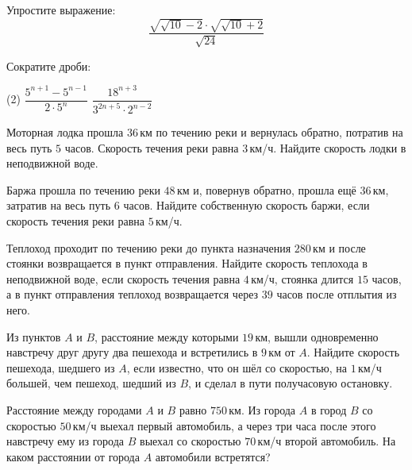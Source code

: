 %
%

\begin{class}[number=1]
	\begin{listofex}
		\item Упростите выражение:
		\[\dfrac{\sqrt{\sqrt{10}-2}\cdot\sqrt{\sqrt{10}+2}}{\sqrt{24}}\]
		\item Сократите дроби:
		\begin{tasks}(2)
			\task \( \dfrac{5^{n+1}-5^{n-1}}{2\cdot5^n} \)
			\task \( \dfrac{18^{n+3}}{3^{2n+5}\cdot2^{n-2}} \)
		\end{tasks}
		\item Моторная лодка прошла \( 36 \) км по течению реки и вернулась обратно, потратив на весь путь \( 5 \) часов. Скорость течения реки равна \( 3 \) км/ч. Найдите скорость лодки в неподвижной воде.
		\item Баржа прошла по течению реки \( 48 \) км и, повернув обратно, прошла ещё \( 36 \) км, затратив на весь путь \( 6 \) часов. Найдите собственную скорость баржи, если скорость течения реки равна \( 5 \) км/ч.
		\item Теплоход проходит по течению реки до пункта назначения \( 280 \) км и после стоянки возвращается в пункт отправления. Найдите скорость теплохода в неподвижной воде, если скорость течения равна \( 4 \) км/ч, стоянка длится \( 15 \) часов, а в пункт отправления теплоход возвращается через \( 39 \) часов после отплытия из него.
		\item Из пунктов \( A \) и \( B \), расстояние между которыми \( 19 \) км, вышли одновременно навстречу друг другу два пешехода и встретились в \( 9 \) км от \( A \). Найдите скорость пешехода, шедшего из \( A \), если известно, что он шёл со скоростью, на \( 1 \) км/ч большей, чем пешеход, шедший из \( B \), и сделал в пути получасовую остановку.
		\item Расстояние между городами \( A \) и \( B \) равно \( 750 \) км. Из города \( A \) в город \( B \) со скоростью \( 50 \) км/ч выехал первый автомобиль, а через три часа после этого навстречу ему из города \( B \) выехал со скоростью \( 70 \) км/ч второй автомобиль. На каком расстоянии от города \( A \) автомобили встретятся?
	\end{listofex}
\end{class}

